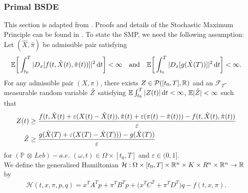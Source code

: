 
\subsubsection{Primal BSDE}
This section is adapted from \cite{Duality_Method_for_Multidimensional_Nonsmooth_Constrained_Linear_Convex_Stochastic_Control}. Proofs and details of the Stochastic Maximum Principle can be found in \cite{The_Stochastic_Maximum_Principle_for_Linear_Convex_Optimal_Control_with_Random_Coefficients}. To state the SMP, we need the following assumption:\\

Let $(\hat{X}, \hat{\pi})$ be admissible pair satisfying 
\begin{equation*}
    \mathbb{E} \bigg[ \int_{t_0}^T |D_x[f(t, \hat{X}(t), \hat{\pi}(t))]|^2 \mathop{}\!\mathrm{d} t \bigg] < \infty \quad \text{and} \quad \mathbb{E} \bigg[ \int_{t_0}^T |D_x[g(\hat{X}(T))]|^2 \mathop{}\!\mathrm{d} t \bigg] < \infty .
\end{equation*}
For any admissible pair $(X, \pi)$, there exists $Z \in \mathcal{P}([t_0, T], \mathbb{R})$ and an $\mathcal{F}_T$-measurable random variable $\Tilde{Z}$ satisfying $\mathbb{E} \int_{t_0}^T |Z(t)| \mathop{}\!\mathrm{d} t < \infty$, $\mathbb{E} |\Tilde{Z}| < \infty$ such that
\begin{align*}
    Z(t) &\ge \frac{f(t, \hat{X}(t) + \varepsilon(X(t) - \hat{X}(t)), \hat{\pi}(t) + \varepsilon(\pi(t) - \hat{\pi}(t))) - f(t, \hat{X}(t), \hat{\pi}(t))}{\varepsilon}\\
    \Tilde{Z} &\ge \frac{g(\hat{X}(T) + \varepsilon(X(T) - \hat{X}(T))) - g(\hat{X}(T))}{\varepsilon}
\end{align*}
for $(\mathbb{P} \, \otimes \, Leb)-a.e.$ $(\omega, t) \in \Omega \times [t_0, T]$ and $\varepsilon \in (0, 1]$.\\

We define the generalised Hamiltonian $\mathcal{H} :\Omega \times [t_0, T] \times \mathbb{R}^n \times K \times R^n \times \mathbb{R}^{n} \to \mathbb{R}$ by
\begin{align*}
    \mathcal{H}(t, x, \pi, p, q) = x^T A^T p + \pi^T B^T p + \bigg( x^T C^T  +  \pi^T D^T \bigg) q - f(t,x,\pi).
\end{align*}

